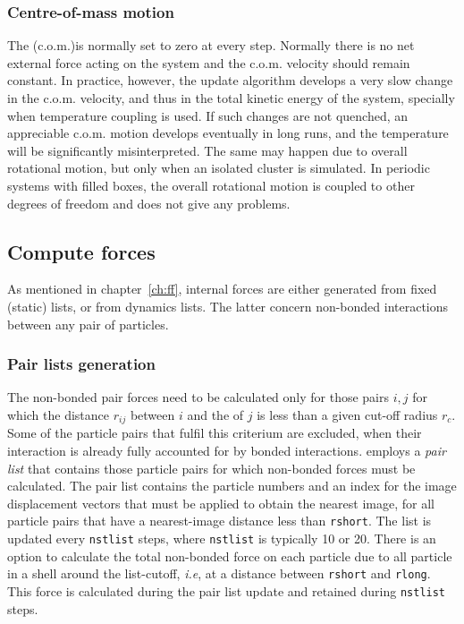 \subsubsection*{Centre-of-mass motion}
The  (c.o.m.)is normally set to zero at every step. 
Normally there is no net external force acting on the system and the c.o.m.
velocity should remain constant. In practice, however, the update
algorithm develops a very slow change in the c.o.m. velocity, and thus
in the total kinetic energy of the system, 
specially when temperature coupling is used. If such changes are not
quenched, an appreciable c.o.m. motion develops eventually in long
runs, and the temperature will be significantly misinterpreted. The
same may happen due to overall rotational motion, but only when an
isolated cluster is simulated. In periodic systems with filled boxes,
the overall rotational motion is coupled to other degrees of freedom
and does not give any problems.

\subsection{Compute forces}
\label{subsec:forces}
As mentioned in chapter~\ref{ch:ff}, internal forces are
either generated from fixed (static) lists, or from dynamics lists.
The latter concern non-bonded interactions between any pair of particles.

\subsubsection*{Pair lists generation}
The non-bonded pair forces need to be calculated only for those pairs
$i,j$  for which the distance $r_{ij}$ between $i$ and the 
of  $j$ is less than a given cut-off radius $r_c$. Some of the
particle pairs that fulfil this criterium are excluded, when their
interaction is already fully accounted for by bonded interactions. {\gromacs}
employs  a {\em pair list} that contains 
those  particle pairs for which non-bonded forces must be calculated.
The  pair list contains the particle numbers and an index for the image
displacement vectors that must be applied to  obtain the nearest
image, for  all particle pairs that
have a  nearest-image distance less than \verb'rshort'. The list is
updated  every \verb'nstlist' steps, where \verb'nstlist' is typically
10 or  20. There is an option to calculate the total non-bonded force
on each  particle due to all particle in a shell around the
list-cutoff, {\em  i.e}, at a distance between \verb'rshort' and
\verb'rlong'.  This force is calculated during the pair list update
and  retained during \verb'nstlist' steps.

